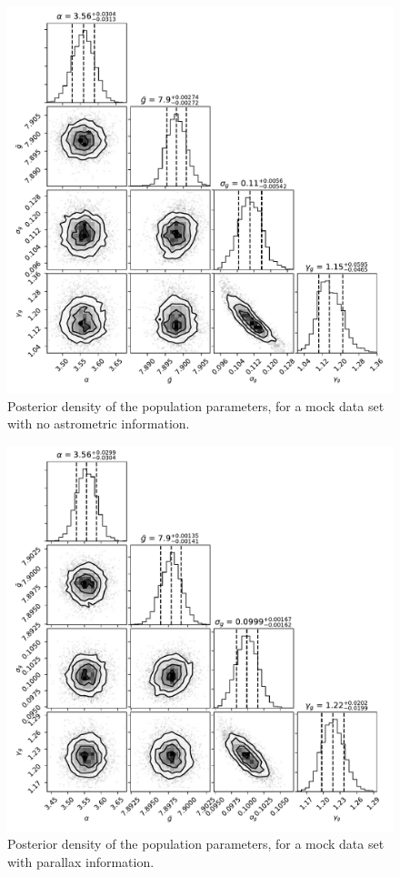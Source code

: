 \documentclass[fleqn,usenatbib]{mnras}
\begin{document}
\begin{figure}
	\includegraphics[width=.8\textwidth]{toy_chain.pdf}
    \caption{Posterior density of the population parameters, for a mock data set with no astrometric information.}
    \label{fig:chain}
\end{figure}

\begin{figure}
	\includegraphics[width=.8\textwidth]{toy_chain_include-parallax.pdf}
    \caption{Posterior density of the population parameters, for a mock data set with parallax information.}
    \label{fig:chain_parallax}
\end{figure}
\end{document}
